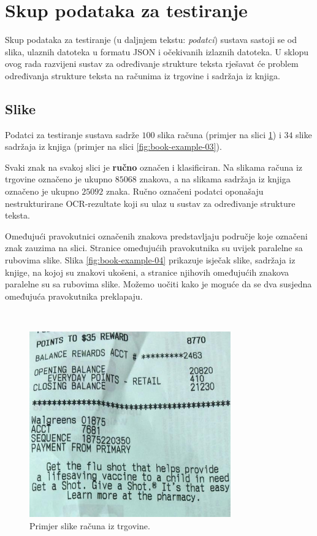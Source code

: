 \documentclass[times, utf8, zavrsni]{fer}
\begin{document}
\section{Skup podataka za testiranje}
\label{sec:skup-padataka-za-testiranje}
Skup podataka za testiranje (u daljnjem tekstu: \emph{podatci})
sustava sastoji se od slika, ulaznih datoteka u formatu JSON i
očekivanih izlaznih datoteka. U sklopu ovog rada razvijeni sustav za
određivanje strukture teksta rješavat će problem određivanja strukture teksta
na računima iz trgovine i sadržaja iz knjiga.




\subsection{Slike}
\label{subsec:slike}
Podatci za testiranje sustava sadrže $100$ slika računa (primjer na slici
\ref{fig:receipt-example-04}) i $34$ slike sadržaja iz knjiga (primjer na slici
\ref{fig:book-example-03}).

Svaki znak na svakoj slici je \textbf{ručno} označen i klasificiran. Na slikama
računa iz trgovine označeno je ukupno $85068$ znakova, a na slikama sadržaja iz
knjiga označeno je ukupno $25092$ znaka. Ručno označeni podatci oponašaju
nestrukturirane OCR-rezultate koji su ulaz u sustav za određivanje strukture
teksta.

Omeđujući pravokutnici označenih znakova predstavljaju područje koje označeni
znak zauzima na slici. Stranice omeđujućih pravokutnika su uvijek paralelne sa
rubovima slike. Slika \ref{fig:book-example-04} prikazuje isječak slike,
sadržaja iz knjige, na kojoj su znakovi ukošeni, a stranice njihovih omeđujućih
znakova paralelne su sa rubovima slike. Možemo uočiti kako je moguće da se dva
susjedna omeđujuća pravokutnika preklapaju.

\

\begin{figure}[!htb]
    \centering
    \captionsetup{justification=centering,margin=2cm}
    \includegraphics[height=8cm]{images/receipt-example-04.jpg}
    \caption{Primjer slike računa iz trgovine.}
    \label{fig:receipt-example-04}
\end{figure}
\end{document}
